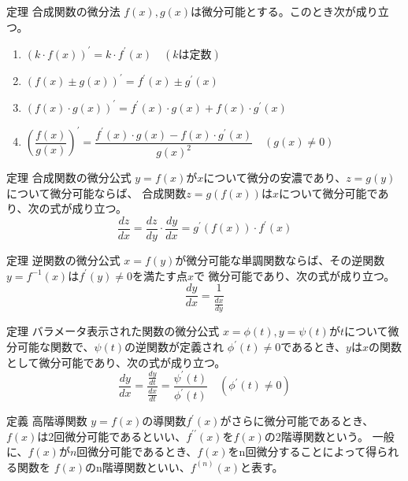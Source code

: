\documentclass[a4paper]{jarticle}
\begin{document}
    \begin{itembox}[l]{定理 合成関数の微分法}
        $f(x), g(x)$は微分可能とする。このとき次が成り立つ。
        \begin{enumerate}
            \item $(k \cdot f(x))^{\prime} = k \cdot f^{\prime}(x) \quad (kは定数)$
            \item $(f(x) \pm g(x))^{\prime} = f^{\prime}(x) \pm g^{\prime}(x)$
            \item $(f(x) \cdot g(x))^{\prime} = f^{\prime}(x) \cdot g(x) + f(x) \cdot g^{\prime}(x)$
            \item $\left(\dfrac{f(x)}{g(x)}\right)^{\prime} = \dfrac{f^{\prime}(x) \cdot g(x) - f(x) \cdot g^{\prime}(x)}{g(x)^2} \quad (g(x) \neq 0)$
        \end{enumerate}
    \end{itembox}

    \begin{itembox}[l]{定理 合成関数の微分公式}
        $y=f(x)$が$x$について微分の安濃であり、$z=g(y)$について微分可能ならば、
        合成関数$z=g(f(x))$は$x$について微分可能であり、次の式が成り立つ。
        \begin{equation}
            \frac{dz}{dx} = \frac{dz}{dy} \cdot \frac{dy}{dx} = g^{\prime}(f(x)) \cdot f^{\prime}(x)
        \end{equation}
    \end{itembox}

    \begin{itembox}[l]{定理 逆関数の微分公式}
        $x=f(y)$が微分可能な単調関数ならば、その逆関数$y=f^{-1}(x)$は$f^{\prime}(y) \neq 0$を満たす点$x$で
        微分可能であり、次の式が成り立つ。
        \begin{equation}
            \frac{dy}{dx} = \frac{1}{\frac{dx}{dy}}
        \end{equation}
    \end{itembox}

    \begin{itembox}[l]{定理 バラメータ表示された関数の微分公式}
        $x=\phi(t), y=\psi(t)$が$t$について微分可能な関数で、$\psi(t)$の逆関数が定義され
        $\phi^{\prime}(t) \neq 0$であるとき、$y$は$x$の関数として微分可能であり、次の式が成り立つ。
        \begin{equation}
            \frac{dy}{dx} = \frac{\frac{dy}{dt}}{\frac{dx}{dt}} = \frac{\psi^{\prime}(t)}{\phi^{\prime}(t)} \quad (\phi^{\prime}(t) \neq 0)
        \end{equation}
    \end{itembox}

    \begin{itembox}[l]{定義 高階導関数}
       $y=f(x)$の導関数$f^{\prime}(x)$がさらに微分可能であるとき、
        $f(x)$は2回微分可能であるといい、$f^{\prime \prime}(x)$を$f(x)$の2階導関数という。
        一般に、$f(x)$が$n$回微分可能であるとき、$f(x)$をn回微分することによって得られる関数を
        $f(x)$のn階導関数といい、$f^{(n)}(x)$と表す。
    \end{itembox}

%    
%    
\end{document}
